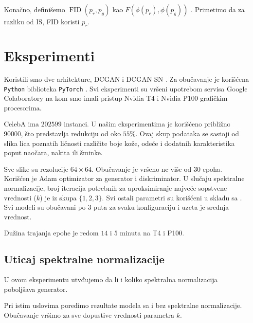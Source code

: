 \documentclass[12pt, a4paper]{article}
\begin{document}
Konačno, definišemo $\operatorname{FID}(p_r, p_g)$ kao $F(\phi(p_r), \phi(p_g))$ \cite{FID-2017}. Primetimo da za razliku od IS, FID koristi $p_r$.

\section{Eksperimenti}
Koristili smo dve arhitekture, DCGAN \cite{DCGAN-2016} i DCGAN-SN \cite{SN-2018}. Za obučavanje je korišćena \texttt{Python} biblioteka \texttt{PyTorch} \cite{PyTorch-2019}. Svi eksperimenti su vršeni upotrebom servisa Google Colaboratory na kom smo imali pristup Nvidia T4 i Nvidia P100 grafičkim procesorima.

CelebA ima $202599$ instanci. U našim eksperimentima je korišćeno približno $90000$, što predstavlja redukciju od oko $55\%$. Ovaj skup podataka se sastoji od slika lica poznatih ličnosti različite boje kože, odeće i dodatnih karakteristika poput naočara, nakita ili šminke.

Sve slike su rezolucije $64 \times 64$. Obučavanje je vršeno ne više od 30 epoha. Korišćen je Adam optimizator za generator i diskriminator. U slučaju spektralne normalizacije, broj iteracija potrebnih za aproksimiranje najveće sopstvene vrednosti ($k$) je iz skupa $\{1, 2, 3\}$. Svi ostali parametri su korišćeni u skladu sa \cite{DCGAN-2016}. Svi modeli su obučavani po $3$ puta za svaku konfiguraciju i uzeta je srednja vrednost.

Dužina trajanja epohe je redom $14$ i $5$ minuta na T4 i P100.

\subsection{Uticaj spektralne normalizacije}
U ovom eksperimentu utvđujemo da li i koliko spektralna normalizacija poboljšava generator.

Pri istim uslovima poredimo rezultate modela sa i bez spektralne normalizacije. Obučavanje vršimo za sve dopustive vrednosti parametra $k$.

%
\end{document}

